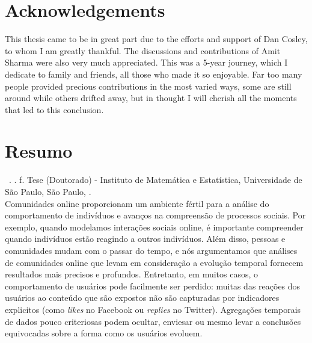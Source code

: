 \documentclass[11pt,twoside,a4paper]{book}
\begin{document}

\chapter*{Acknowledgements}

This thesis came to be in great part due to the efforts and support of Dan Cosley, to whom I am greatly thankful. The discussions and contributions of Amit Sharma were also very much appreciated. This was a 5-year journey, which I dedicate to family and friends, all those who made it so enjoyable. Far too many people provided precious contributions in the most varied ways, some are still around while others drifted away, but in thought I will cherish all the moments that led to this conclusion.


\chapter*{Resumo}

\noindent \surnameAbbr~\textbf{\phdTitleBr}. 
\thesisYear. \thesisPages f. Tese (Doutorado) - Instituto de Matemática e Estatística,
Universidade de São Paulo, São Paulo, \thesisYear.
\\

Comunidades online proporcionam um ambiente fértil para a análise do comportamento de indivíduos e avanços na compreensão de processos sociais. Por exemplo, quando modelamos interações sociais online, é importante compreender quando indivíduos estão reagindo a outros indivíduos. Além disso, pessoas e comunidades mudam com o passar do tempo, e nós argumentamos que análises de comunidades online que levam em consideração a evolução temporal fornecem resultados mais precisos e profundos. Entretanto, em muitos casos, o comportamento de usuários pode facilmente ser perdido: muitas das reações dos usuários ao conteúdo que são expostos não são capturadas por indicadores explicitos (como \textsl{likes} no Facebook ou \textit{replies} no Twitter). Agregações temporais de dados pouco criteriosas podem ocultar, enviesar ou mesmo levar a conclusões equivocadas sobre a forma como os usuários evoluem. 
\end{document}
